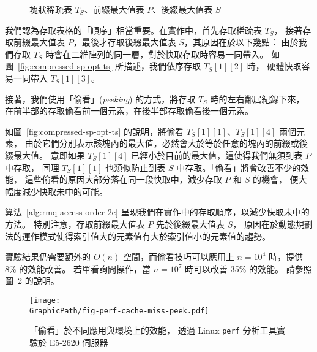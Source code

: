 \begin{figure}[!thb]
  \centering {}  \caption{塊狀稀疏表 $T_S$、前綴最大值表 $P$、後綴最大值表 $S$}
  \label{fig:compressed-sp-opt}
\end{figure}

我們認為存取表格的「順序」相當重要。在實作中，首先存取稀疏表 $T_S$，
接著存取前綴最大值表 $P$，最後才存取後綴最大值表 $S$，其原因在於以下幾點：
由於我們存取 $T_S$ 時會在二維陣列的同一層，對於快取存取時容易一同帶入。
如圖~\ref{fig:compressed-sp-opt-ts} 所描述，我們依序存取 $T_{S}[1][2]$ 時，
硬體快取容易一同帶入 $T_{S}[1][3]$。

接著，我們使用「偷看」({\em peeking}) 的方式，將存取 $T_S$ 時的左右鄰居紀錄下來，
在前半部的存取偷看前一個元素，在後半部存取偷看後一個元素。

如圖~\ref{fig:compressed-sp-opt-ts} 的說明，將偷看 $T_{S}[1][1]$、$T_{S}[1][4]$ 兩個元素，
由於它們分別表示該塊內的最大值，必然會大於等於任意的塊內的前綴或後綴最大值。
意即如果 $T_{S}[1][4]$ 已經小於目前的最大值，這使得我們無須到表 $P$ 中存取，
同理 $T_{S}[1][1]$ 也類似防止到表 $S$ 中存取。「偷看」將會改善不少的效能，
這些偷看的原因大部分落在同一段快取中，減少存取 $P$ 和 $S$ 的機會，
便大幅度減少快取未中的可能。

算法~\ref{alg:rmq-access-order-2e} 呈現我們在實作中的存取順序，以減少快取未中的方法。
特別注意，存取前綴最大值表 $P$ 先於後綴最大值表 $S$，
原因在於動態規劃法的運作模式使得索引值大的元素值有大於索引值小的元素值的趨勢。

實驗結果仍需要額外的 $O(n)$ 空間，而偷看技巧可以應用上 $n=10^4$ 時，提供 8\% 的效能改善。
若單看詢問操作，當 $n=10^7$ 時可以改善 35\% 的效能。
請參照圖~\ref{fig:fig-perf-cache-miss-peek} 的說明。

\begin{figure}
  \centering
  \texttt{[image: \\GraphicPath/fig-perf-cache-miss-peek.pdf]}
  \caption{
  「偷看」於不同應用與環境上的效能，
  透過 Linux {\tt perf} 分析工具實驗於 E5-2620 伺服器}
  \label{fig:fig-perf-cache-miss-peek}
\end{figure}



